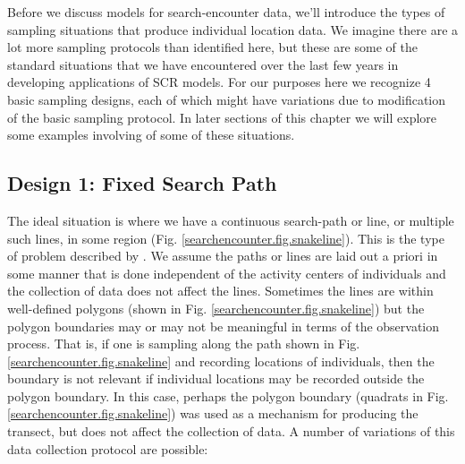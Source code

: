 Before we discuss models for search-encounter data, we'll
introduce the types of sampling situations that
produce individual location data.  We imagine there are a lot more sampling protocols
than identified here, but these are some of the standard situations that we have
encountered over the last few years in developing applications of SCR
models.  For our purposes here we recognize 4 basic sampling designs,
each of which might have variations due to modification of the basic
sampling protocol. In later sections of this chapter we will explore some
examples involving of some of these situations. 

\subsection{Design 1: Fixed Search Path}

The ideal situation is where we have a continuous search-path or
line, or multiple such lines, in some region
(Fig. \ref{searchencounter.fig.snakeline}). This is the type of
problem described by \citet{royle_etal:2011mee}. We assume the paths or
lines are laid out a priori in some manner that is done independent of
the activity centers of individuals and the collection of data does
not affect the lines. 
Sometimes the lines are within well-defined
polygons (shown in Fig. \ref{searchencounter.fig.snakeline}) but the
polygon boundaries may or may not be meaningful in terms of the
observation process. That is, if one is sampling along the path shown
in Fig. \ref{searchencounter.fig.snakeline} and recording locations of
individuals, then the boundary is not relevant if individual locations
may be recorded outside the polygon boundary. In this case, perhaps
the polygon boundary (quadrats in
Fig. \ref{searchencounter.fig.snakeline}) was used as a mechanism for
producing the transect, but does not affect the collection of data.  A
number of variations of this data collection protocol are possible:

